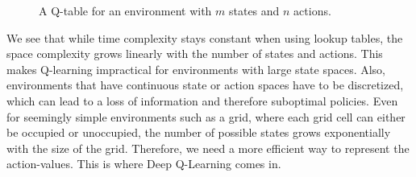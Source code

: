 \begin{figure}[h]
    \centering
    \caption{A Q-table for an environment with $m$ states and $n$ actions.}
    \label{fig:q-table}
\end{figure}
We see that while time complexity stays constant when using lookup tables, the space complexity grows linearly with the number of states and actions. This makes Q-learning impractical for environments with large state spaces. Also, environments that have continuous state or action spaces have to be discretized, which can lead to a loss of information and therefore suboptimal policies. Even for seemingly simple environments such as a grid, where each grid cell can either be occupied or unoccupied, the number of possible states grows exponentially with the size of the grid. Therefore, we need a more efficient way to represent the action-values. This is where Deep Q-Learning comes in.

